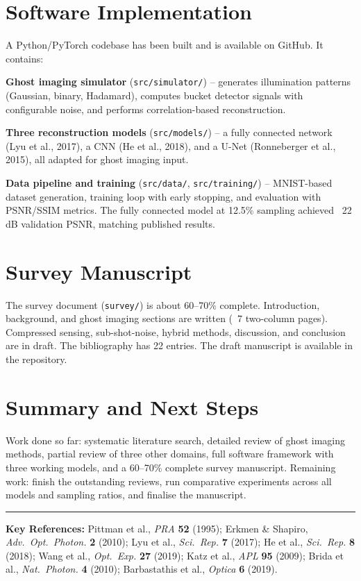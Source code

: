 \documentclass[11pt,a4paper]{article}
\begin{document}
\section{Software Implementation}

A Python/PyTorch codebase has been built and is available on GitHub. It contains:

\textbf{Ghost imaging simulator} (\texttt{src/simulator/}) -- generates illumination patterns (Gaussian, binary, Hadamard), computes bucket detector signals with configurable noise, and performs correlation-based reconstruction.

\textbf{Three reconstruction models} (\texttt{src/models/}) -- a fully connected network (Lyu et al., 2017), a CNN (He et al., 2018), and a U-Net (Ronneberger et al., 2015), all adapted for ghost imaging input.

\textbf{Data pipeline and training} (\texttt{src/data/}, \texttt{src/training/}) -- MNIST-based dataset generation, training loop with early stopping, and evaluation with PSNR/SSIM metrics. The fully connected model at 12.5\% sampling achieved ~22\,dB validation PSNR, matching published results.

\section{Survey Manuscript}

The survey document (\texttt{survey/}) is about 60--70\% complete. Introduction, background, and ghost imaging sections are written (~7 two-column pages). Compressed sensing, sub-shot-noise, hybrid methods, discussion, and conclusion are in draft. The bibliography has 22 entries. The draft manuscript is available in the repository.

\section{Summary and Next Steps}

Work done so far: systematic literature search, detailed review of ghost imaging methods, partial review of three other domains, full software framework with three working models, and a 60--70\% complete survey manuscript. Remaining work: finish the outstanding reviews, run comparative experiments across all models and sampling ratios, and finalise the manuscript.

\vfill
\rule{\textwidth}{0.4pt}
{\scriptsize\textbf{Key References:}
Pittman et al., \textit{PRA} \textbf{52} (1995);
Erkmen \& Shapiro, \textit{Adv.\ Opt.\ Photon.} \textbf{2} (2010);
Lyu et al., \textit{Sci.\ Rep.} \textbf{7} (2017);
He et al., \textit{Sci.\ Rep.} \textbf{8} (2018);
Wang et al., \textit{Opt.\ Exp.} \textbf{27} (2019);
Katz et al., \textit{APL} \textbf{95} (2009);
Brida et al., \textit{Nat.\ Photon.} \textbf{4} (2010);
Barbastathis et al., \textit{Optica} \textbf{6} (2019).}
\end{document}
